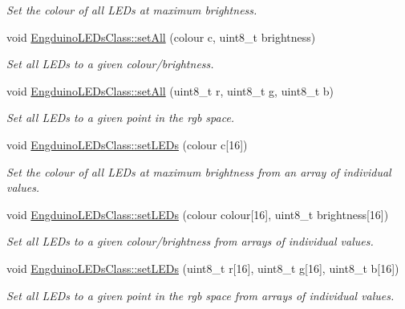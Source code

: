 \begin{DoxyCompactItemize}
\begin{DoxyCompactList}\small\item\em Set the colour of all L\+E\+Ds at maximum brightness. \end{DoxyCompactList}\item 
void \hyperlink{group___engduino_l_e_ds_ga0047bf22f224f1d2bfff77d04b89e89f}{Engduino\+L\+E\+Ds\+Class\+::set\+All} (colour c, uint8\+\_\+t brightness)
\begin{DoxyCompactList}\small\item\em Set all L\+E\+Ds to a given colour/brightness. \end{DoxyCompactList}\item 
void \hyperlink{group___engduino_l_e_ds_gaddff7887dd930a0b8865c92892c0f899}{Engduino\+L\+E\+Ds\+Class\+::set\+All} (uint8\+\_\+t r, uint8\+\_\+t g, uint8\+\_\+t b)
\begin{DoxyCompactList}\small\item\em Set all L\+E\+Ds to a given point in the rgb space. \end{DoxyCompactList}\item 
void \hyperlink{group___engduino_l_e_ds_ga640f4a7798f27d483f5727baaab12c2e}{Engduino\+L\+E\+Ds\+Class\+::set\+L\+E\+Ds} (colour c\mbox{[}16\mbox{]})
\begin{DoxyCompactList}\small\item\em Set the colour of all L\+E\+Ds at maximum brightness from an array of individual values. \end{DoxyCompactList}\item 
void \hyperlink{group___engduino_l_e_ds_ga92a706323b3e89453ee6f6b7f2057a59}{Engduino\+L\+E\+Ds\+Class\+::set\+L\+E\+Ds} (colour colour\mbox{[}16\mbox{]}, uint8\+\_\+t brightness\mbox{[}16\mbox{]})
\begin{DoxyCompactList}\small\item\em Set all L\+E\+Ds to a given colour/brightness from arrays of individual values. \end{DoxyCompactList}\item 
void \hyperlink{group___engduino_l_e_ds_ga48ac99a4c0feb705368a0eecb6eb6c6d}{Engduino\+L\+E\+Ds\+Class\+::set\+L\+E\+Ds} (uint8\+\_\+t r\mbox{[}16\mbox{]}, uint8\+\_\+t g\mbox{[}16\mbox{]}, uint8\+\_\+t b\mbox{[}16\mbox{]})
\begin{DoxyCompactList}\small\item\em Set all L\+E\+Ds to a given point in the rgb space from arrays of individual values. \end{DoxyCompactList}\item 

\end{DoxyCompactItemize}
